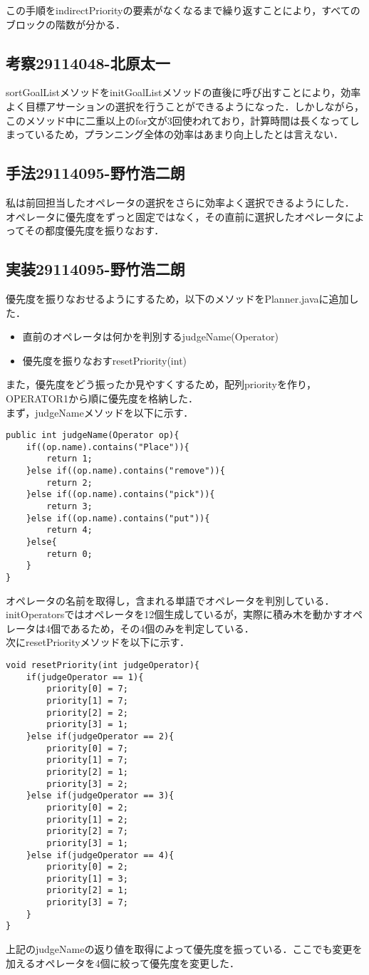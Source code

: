 \documentclass{jarticle}
\begin{document}
この手順をindirectPriorityの要素がなくなるまで繰り返すことにより，すべてのブロックの階数が分かる．

\subsection{考察29114048-北原太一}
sortGoalListメソッドをinitGoalListメソッドの直後に呼び出すことにより，効率よく目標アサーションの選択を行うことができるようになった．しかしながら，このメソッド中に二重以上のfor文が3回使われており，計算時間は長くなってしまっているため，プランニング全体の効率はあまり向上したとは言えない．
\subsection{手法29114095-野竹浩二朗}
私は前回担当したオペレータの選択をさらに効率よく選択できるようにした．\\
オペレータに優先度をずっと固定ではなく，その直前に選択したオペレータによってその都度優先度を振りなおす．

\subsection{実装29114095-野竹浩二朗}
優先度を振りなおせるようにするため，以下のメソッドをPlanner.javaに追加した．
\begin{itemize}
\item 直前のオペレータは何かを判別するjudgeName(Operator)
\item 優先度を振りなおすresetPriority(int)
\end{itemize}
また，優先度をどう振ったか見やすくするため，配列priorityを作り，OPERATOR1から順に優先度を格納した．\\
まず，judgeNameメソッドを以下に示す．
\begin{lstlisting}
public int judgeName(Operator op){
	if((op.name).contains("Place")){
		return 1;
	}else if((op.name).contains("remove")){
		return 2;
	}else if((op.name).contains("pick")){
		return 3;
	}else if((op.name).contains("put")){
		return 4;
	}else{
		return 0;
	}
}
\end{lstlisting}
オペレータの名前を取得し，含まれる単語でオペレータを判別している．initOperatorsではオペレータを12個生成しているが，実際に積み木を動かすオペレータは4個であるため，その4個のみを判定している．\\
次にresetPriorityメソッドを以下に示す．
\begin{lstlisting}
void resetPriority(int judgeOperator){
	if(judgeOperator == 1){
		priority[0] = 7;
		priority[1] = 7;
		priority[2] = 2;
		priority[3] = 1;
	}else if(judgeOperator == 2){
		priority[0] = 7;
		priority[1] = 7;
		priority[2] = 1;
		priority[3] = 2;
	}else if(judgeOperator == 3){
		priority[0] = 2;
		priority[1] = 2;
		priority[2] = 7;
		priority[3] = 1;
	}else if(judgeOperator == 4){
		priority[0] = 2;
		priority[1] = 3;
		priority[2] = 1;
		priority[3] = 7;
	}
}
\end{lstlisting}
上記のjudgeNameの返り値を取得によって優先度を振っている．ここでも変更を加えるオペレータを4個に絞って優先度を変更した．
\end{document}
